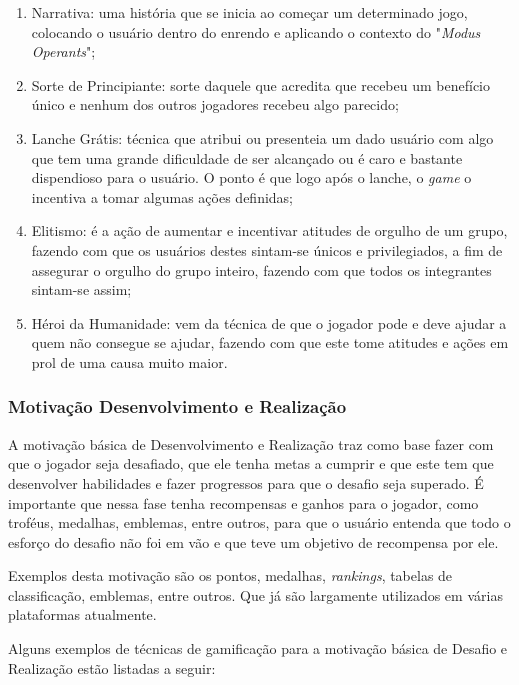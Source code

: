 \begin{enumerate}
    \item Narrativa: uma história que se inicia ao começar um determinado
        jogo, colocando o usuário dentro do enrendo e aplicando o contexto
        do "\textit{Modus Operants}";
    \item Sorte de Principiante: sorte daquele que acredita que recebeu
        um benefício único e nenhum dos outros jogadores recebeu algo
        parecido;
    \item Lanche Grátis: técnica que atribui ou presenteia um dado usuário
        com algo que tem uma grande dificuldade de ser alcançado ou é
        caro e bastante dispendioso para o usuário.
        O ponto é que logo após o lanche, o \textit{game} o incentiva a tomar
        algumas ações definidas;
    \item Elitismo: é a ação de aumentar e incentivar atitudes de orgulho
        de um grupo, fazendo com que os usuários destes sintam-se
        únicos e privilegiados, a fim de assegurar o orgulho do
        grupo inteiro, fazendo com que todos os integrantes sintam-se assim;
    \item Héroi da Humanidade: vem da técnica de que o jogador pode e deve
        ajudar a quem não consegue se ajudar, fazendo com que este tome
        atitudes e ações em prol de uma causa muito maior.
\end{enumerate}

\subsubsection{Motivação Desenvolvimento e Realização}
\label{sub:desenvolvimentoerealizacao}
A motivação básica de Desenvolvimento e Realização traz como base fazer
com que o jogador seja desafiado, que ele tenha metas a cumprir e que este
tem que desenvolver habilidades e fazer progressos para que o desafio
seja superado. É importante que nessa fase tenha recompensas e ganhos para
o jogador, como troféus, medalhas, emblemas, entre outros, para que o
usuário entenda que todo o esforço do desafio não foi em vão e que
teve um objetivo de recompensa por ele.

Exemplos desta motivação são os pontos, medalhas, \textit{rankings}, tabelas de
classificação, emblemas, entre outros. Que já são largamente utilizados
em várias plataformas atualmente.

Alguns exemplos de técnicas de gamificação para a motivação básica
de Desafio e Realização estão listadas a seguir:

